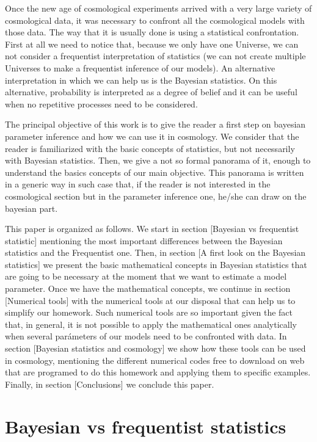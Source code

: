 \documentclass[onecolumn,           %
               showpacs,            %
               preprintnumbers,     %
               aps,                 %
               prl,          	    %
               letterpaper,             %
               superscriptaddress,      %
               nofootinbib,         %
               tightenlines,        %
               floats,floatfix      %
               ,usenatbib,
               ]{revtex4-1}
\begin{document}
Once the new age of cosmological experiments arrived with a very large variety of cosmological data, it was necessary to confront all the cosmological models with those data. The way that it is usually done is using a statistical confrontation. First at all we need to notice that, because we only have one Universe, we can not consider a frequentist interpretation of statistics (we can not create multiple Universes to make a frequentist inference of our models). An alternative interpretation in which we can help us is the Bayesian statistics. On this alternative, probability is interpreted as a degree of belief and it can be useful when no repetitive processes need to be considered.  

The principal objective of this work is to give the reader a first step on bayesian parameter inference and how we can use it in cosmology. We consider that the reader is familiarized with the basic concepts of statistics, but not necessarily with Bayesian statistics. Then, we give a not so formal panorama of it, enough to understand the basics concepts of our main objective. This panorama is written in a generic way in  such case that, if the reader is not interested in the cosmological section but in the parameter inference one, he/she can draw on the bayesian part.  

This paper is organized as follows. We start in section [Bayesian vs frequentist statistic] mentioning the most important differences between the Bayesian statistics and the Frequentist one. Then, in section [A first look on the Bayesian statistics] we present the basic mathematical concepts in Bayesian statistics that are going to be necessary at the moment that we want to estimate a model parameter. Once we have the mathematical concepts, we continue in section [Numerical tools] with the numerical tools at our disposal that can help us to simplify our homework. Such numerical tools are so important given the fact that, in general, it is not possible to apply the mathematical ones analytically when several parámeters of our models need to be confronted with data. In section [Bayesian statistics and cosmology] we show how these tools can be used in cosmology, mentioning the different numerical codes free to download on web that are programed to do this homework and applying them to specific examples. Finally, in section [Conclusions] we conclude this paper.

\section{Bayesian vs frequentist statistics}
\end{document}
